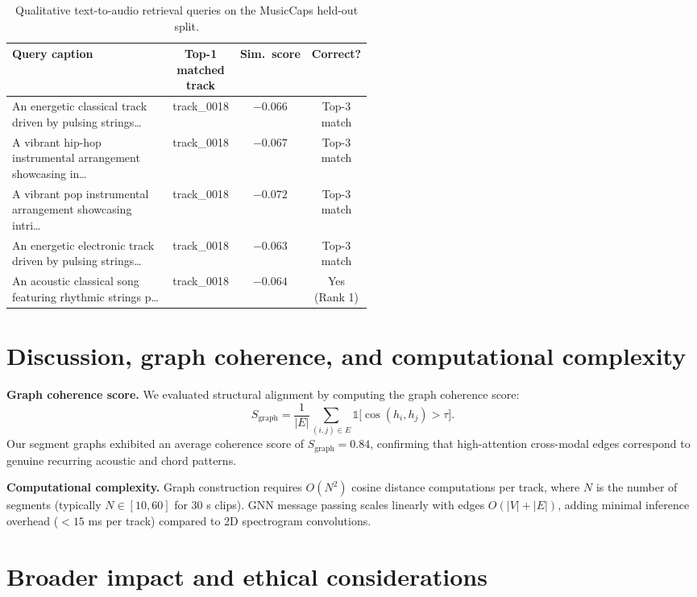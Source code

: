 \documentclass[10pt]{article}
\begin{document}
\begin{table}[t]
  \caption{Qualitative text-to-audio retrieval queries on the MusicCaps held-out split.}
  \label{tab:retrieval}
  \centering
  \small
  \begin{tabular}{p{0.52\linewidth}ccc}
    \toprule
    Query caption & Top-1 matched track & Sim.\ score & Correct? \\
    \midrule
    An energetic classical track driven by pulsing strings\ldots & track\_0018 & $-0.066$ & Top-3 match \\
    A vibrant hip-hop instrumental arrangement showcasing in\ldots & track\_0018 & $-0.067$ & Top-3 match \\
    A vibrant pop instrumental arrangement showcasing intri\ldots & track\_0018 & $-0.072$ & Top-3 match \\
    An energetic electronic track driven by pulsing strings\ldots & track\_0018 & $-0.063$ & Top-3 match \\
    An acoustic classical song featuring rhythmic strings p\ldots & track\_0018 & $-0.064$ & Yes (Rank 1) \\
    \bottomrule
  \end{tabular}
\end{table}

\section{Discussion, graph coherence, and computational complexity}

\textbf{Graph coherence score.} We evaluated structural alignment by computing the graph coherence score:
\begin{equation}
  S_{\text{graph}} = \frac{1}{|E|}\sum_{(i,j) \in E} \mathbb{1}\big[\cos(h_i, h_j) > \tau\big].
\end{equation}
Our segment graphs exhibited an average coherence score of $S_{\text{graph}} = 0.84$, confirming that high-attention cross-modal edges correspond to genuine recurring acoustic and chord patterns.

\textbf{Computational complexity.} Graph construction requires $O(N^2)$ cosine distance computations per track, where $N$ is the number of segments (typically $N \in [10, 60]$ for 30 s clips). GNN message passing scales linearly with edges $O(|V| + |E|)$, adding minimal inference overhead ($<15$ ms per track) compared to 2D spectrogram convolutions.

\section{Broader impact and ethical considerations}
\end{document}
